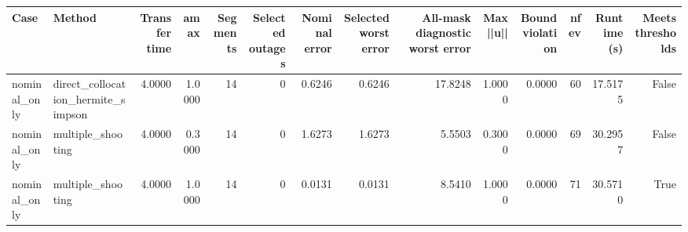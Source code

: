 \begin{tabular}{llrrrrrrrrrrrr}
\toprule
Case & Method & Transfer time & amax & Segments & Selected outages & Nominal error & Selected worst error & All-mask diagnostic worst error & Max ||u|| & Bound violation & nfev & Runtime (s) & Meets thresholds \\
\midrule
nominal\_only & direct\_collocation\_hermite\_simpson & 4.0000 & 1.0000 & 14 & 0 & 0.6246 & 0.6246 & 17.8248 & 1.0000 & 0.0000 & 60 & 17.5175 & False \\
nominal\_only & multiple\_shooting & 4.0000 & 0.3000 & 14 & 0 & 1.6273 & 1.6273 & 5.5503 & 0.3000 & 0.0000 & 69 & 30.2957 & False \\
nominal\_only & multiple\_shooting & 4.0000 & 1.0000 & 14 & 0 & 0.0131 & 0.0131 & 8.5410 & 1.0000 & 0.0000 & 71 & 30.5710 & True \\
\bottomrule
\end{tabular}
